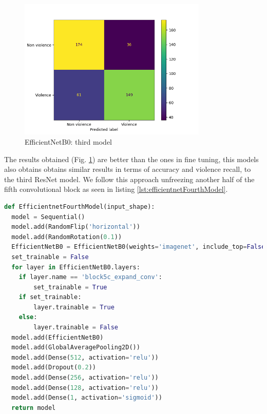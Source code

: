 \begin{figure}[h!]
    \centering
    \includegraphics[width=0.8\textwidth]{images/731a-EfficientNetB0_15-5a4e-conf_matrix.png}
    \caption{EfficientNetB0: third model}
    \label{fig:EfficientNetB0_15}
\end{figure}
The results obtained (Fig. \ref{fig:EfficientNetB0_15}) are better than the ones in fine tuning, this models also obtains obtains similar results in terms of accuracy and violence recall, to the third ResNet model.
We follow this approach unfreezing another half of the fifth convolutional block as seen in listing \ref{lst:efficientnetFourthModel}.

\begin{lstlisting}[language=python, caption={EfficientNetB0 fourth model}, label={lst:efficientnetFourthModel}]
def EfficientnetFourthModel(input_shape):
  model = Sequential()
  model.add(RandomFlip('horizontal'))
  model.add(RandomRotation(0.1))
  EfficientNetB0 = EfficientNetB0(weights='imagenet', include_top=False, input_shape=input_shape)
  set_trainable = False
  for layer in EfficientNetB0.layers:
    if layer.name == 'block5c_expand_conv':
        set_trainable = True
    if set_trainable:
        layer.trainable = True
    else:
        layer.trainable = False
  model.add(EfficientNetB0)
  model.add(GlobalAveragePooling2D())
  model.add(Dense(512, activation='relu'))
  model.add(Dropout(0.2))
  model.add(Dense(256, activation='relu'))
  model.add(Dense(128, activation='relu'))
  model.add(Dense(1, activation='sigmoid'))
  return model
\end{lstlisting}

